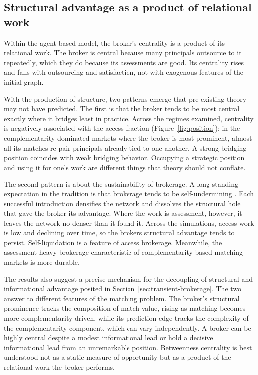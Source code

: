 \documentclass[
]{article}
\begin{document}
\subsection{Structural advantage as a product of relational work}

Within the agent-based model, the broker's centrality is a product of its relational work. The broker is central because many principals outsource to it repeatedly, which they do because its assessments are good. Its centrality rises and falls with outsourcing and satisfaction, not with exogenous features of the initial graph.

With the production of structure, two patterns emerge that pre-existing theory may not have predicted. The first is that the broker tends to be most central exactly where it bridges least in practice. Across the regimes examined, centrality is negatively associated with the access fraction (Figure~\ref{fig:position}): in the complementarity-dominated markets where the broker is most prominent, almost all its matches re-pair principals already tied to one another. A strong bridging position coincides with weak bridging behavior. Occupying a strategic position and using it for one's work are different things that theory should not conflate.

The second pattern is about the sustainability of brokerage. A long-standing expectation in the tradition is that brokerage tends to be self-undermining \autocite{burtStructuralHolesSocial1992,burtBridgeDecay2002a,stovelStabilizingBrokerage2011}. Each successful introduction densifies the network and dissolves the structural hole that gave the broker its advantage. Where the work is assessment, however, it leaves the network no denser than it found it. Across the simulations, access work is low and declining over time, so the broker\textquotesingle s structural advantage tends to persist. Self-liquidation is a feature of access brokerage. Meanwhile, the assessment-heavy brokerage characteristic of complementarity-based matching markets is more durable.

The results also suggest a precise mechanism for the decoupling of structural and informational advantage posited in Section~\ref{sec:transient-brokerage}. The two answer to different features of the matching problem. The broker's structural prominence tracks the composition of match value, rising as matching becomes more complementarity-driven, while its prediction edge tracks the complexity of the complementarity component, which can vary independently. A broker can be highly central despite a modest informational lead or hold a decisive informational lead from an unremarkable position. Betweenness centrality is best understood not as a static measure of opportunity but as a product of the relational work the broker performs.
\end{document}
